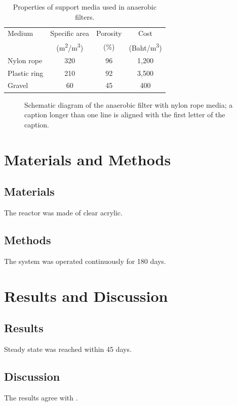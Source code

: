 \documentclass[english]{kuthesis}
\begin{document}
\begin{table}[htbp]
  \caption{Properties of support media used in anaerobic filters.}
  \label{tab:media}
  \centering
  \begin{tabular}{lccc}
    \toprule
    Medium & Specific area & Porosity & Cost \\
           & (m\textsuperscript{2}/m\textsuperscript{3}) & (\%) & (Baht/m\textsuperscript{3}) \\
    \midrule
    Nylon rope   & 320 & 96 & 1,200 \\
    Plastic ring & 210 & 92 & 3,500 \\
    Gravel       & 60  & 45 & 400 \\
    \bottomrule
  \end{tabular}
\end{table}

\begin{figure}[htbp]
  \centering
  \caption{Schematic diagram of the anaerobic filter with nylon rope media; a caption longer
           than one line is aligned with the first letter of the caption.}
  \label{fig:reactor}
\end{figure}

\chapter{Materials and Methods}
\section{Materials}
The reactor was made of clear acrylic.
\section{Methods}
The system was operated continuously for 180 days.

\chapter{Results and Discussion}
\section{Results}
Steady state was reached within 45 days.
\section{Discussion}
The results agree with \textcite{peterson2004}.
\end{document}
